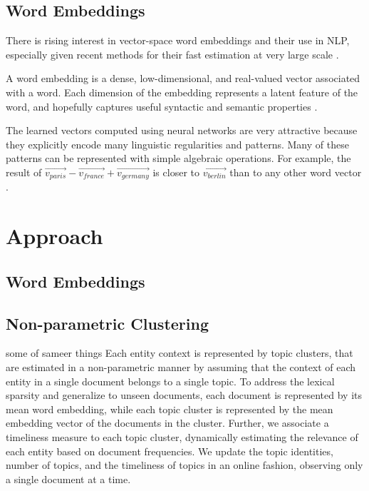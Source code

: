 \documentclass{article}
\begin{document}
\subsection{Word Embeddings}

There is rising interest in vector-space word embeddings and their use in NLP, especially given recent methods for their fast estimation at very large scale \cite{Arvind14}.

A word embedding is a dense, low-dimensional, and real-valued vector associated with a word. Each dimension of the embedding represents a latent feature of the word, and hopefully captures useful syntactic and semantic properties \cite{Turian10wordrepresentations}.

The learned vectors computed using neural networks are very attractive because they explicitly encode many linguistic regularities and patterns. Many of these patterns can be represented with simple algebraic operations. For example, the result of $\vec{v_{paris}} - \vec{v_{france}} + \vec{v_{germany}}$ is closer to $\vec{v_{berlin}}$ than to any other word vector \cite{mikolovChen,mikolovYih}.

\section{Approach}
\label{approach}

\subsection{Word Embeddings}

\subsection{Non-parametric Clustering}

some of sameer things
Each entity context is represented by topic clusters, that are estimated in a non-parametric manner by assuming that the context of each entity in a single document belongs to a single topic. To address the lexical sparsity and generalize to unseen documents, each document is represented by its mean word embedding, while each topic cluster is represented by the mean embedding vector of the documents in the cluster. Further, we associate a timeliness measure to each topic cluster, dynamically estimating the relevance of each entity based on document frequencies. We update the topic identities, number of topics, and the timeliness of topics in an online fashion, observing only a single document at a time. 
\end{document}
